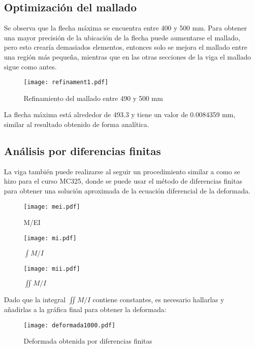 \documentclass[12pt,a4paper]{article}
\begin{document}
\subsection*{Optimización del mallado}
Se observa que la flecha máxima se encuentra entre 400 y 500 mm. Para obtener una mayor precisión de la ubicación de la flecha puede aumentarse el mallado, pero esto crearía demasiados elementos, entonces solo se mejora el mallado entre una región más pequeña, mientras que en las otras secciones de la viga el mallado sigue como antes.
\begin{figure}[H]
    \centering
    \texttt{[image: refinament1.pdf]}
    \caption{Refinamiento del mallado entre 490 y 500 mm}
\end{figure}
La flecha máxima está alrededor de 493.3 y tiene un valor de 0.0084359 mm, similar al resultado obtenido de forma analítica.
\subsection*{Análisis por diferencias finitas}
La viga también puede realizarse al seguir un procedimiento similar a como se hizo para el curso MC325, donde se puede usar el método de diferencias finitas para obtener una solución aproximada de la ecuación diferencial de la deformada. 
\begin{figure}[H]
    \centering
    \texttt{[image: mei.pdf]}
    \caption{M/EI}
\end{figure}
\begin{figure}[H]
    \centering
    \texttt{[image: mi.pdf]}
    \caption{$\int M/I$}
\end{figure}
\begin{figure}[H]
    \centering
    \texttt{[image: mii.pdf]}
    \caption{$\iint M/I$}
\end{figure}
Dado que la integral $\iint M/I$ contiene constantes, es necesario hallarlas y añadirlas a la gráfica final para obtener la deformada:
\begin{figure}[H]
    \centering
    \texttt{[image: deformada1000.pdf]}
    \caption{Deformada obtenida por diferencias finitas}
\end{figure}
\end{document}
